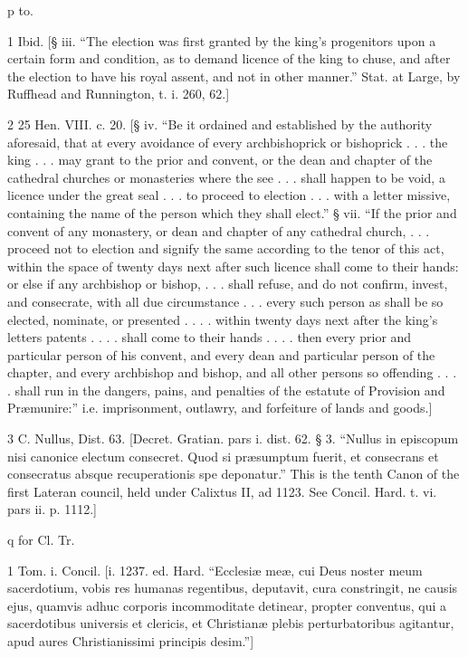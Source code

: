 p
to.

1
Ibid. [§ iii. “The election was first granted by the king’s progenitors upon a certain form and condition, as to demand licence of the king to chuse, and after the election to have his royal assent, and not in other manner.” Stat. at Large, by Ruffhead and Runnington, t. i. 260, 62.]

2
25 Hen. VIII. c. 20. [§ iv. “Be it ordained and established by the authority aforesaid, that at every avoidance of every archbishoprick or bishoprick . . . the king . . . may grant to the prior and convent, or the dean and chapter of the cathedral churches or monasteries where the see . . . shall happen to be void, a licence under the great seal . . . to proceed to election . . . with a letter missive, containing the name of the person which they shall elect.” § vii. “If the prior and convent of any monastery, or dean and chapter of any cathedral church, . . . proceed not to election and signify the same according to the tenor of this act, within the space of twenty days next after such licence shall come to their hands: or else if any archbishop or bishop, . . . shall refuse, and do not confirm, invest, and consecrate, with all due circumstance . . . every such person as shall be so elected, nominate, or presented . . . . within twenty days next after the king’s letters patents . . . . shall come to their hands . . . . then every prior and particular person of his convent, and every dean and particular person of the chapter, and every archbishop and bishop, and all other persons so offending . . . . shall run in the dangers, pains, and penalties of the estatute of Provision and Præmunire:” i.e. imprisonment, outlawry, and forfeiture of lands and goods.]

3
C. Nullus, Dist. 63. [Decret. Gratian. pars i. dist. 62. § 3. “Nullus in episcopum nisi canonice electum consecret. Quod si præsumptum fuerit, et consecrans et consecratus absque recuperationis spe deponatur.” This is the tenth Canon of the first Lateran council, held under Calixtus II, ad 1123. See Concil. Hard. t. vi. pars ii. p. 1112.]

q
for Cl. Tr.

1
Tom. i. Concil. [i. 1237. ed. Hard. “Ecclesiæ meæ, cui Deus noster meum sacerdotium, vobis res humanas regentibus, deputavit, cura constringit, ne causis ejus, quamvis adhuc corporis incommoditate detinear, propter conventus, qui a sacerdotibus universis et clericis, et Christianæ plebis perturbatoribus agitantur, apud aures Christianissimi principis desim.”]


